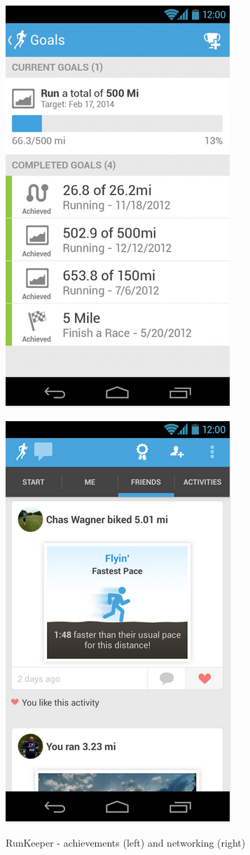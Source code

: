 \documentclass[a4paper,12pt]{article}
\begin{document}
\begin{figure}[!ht]
\centering
\begin{minipage}{.5\textwidth}
  \centering
  \includegraphics[width=.5\linewidth]{./images/application-runkeeper-goals}
  \label{application-runkeeper-achievements}
\end{minipage}%
\begin{minipage}{.5\textwidth}
  \centering
  \includegraphics[width=.5\linewidth]{./images/application-runkeeper-socialnetworking}
  \label{application-runkeeper-social}
\end{minipage}
\caption{RunKeeper - achievements (left) and networking (right)}
\end{figure}
\end{document}
